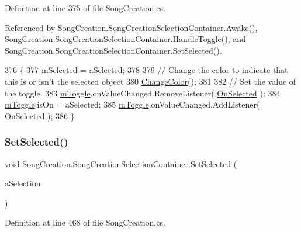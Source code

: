 Definition at line 375 of file Song\+Creation.\+cs.



Referenced by Song\+Creation.\+Song\+Creation\+Selection\+Container.\+Awake(), Song\+Creation.\+Song\+Creation\+Selection\+Container.\+Handle\+Toggle(), and Song\+Creation.\+Song\+Creation\+Selection\+Container.\+Set\+Selected().


\begin{DoxyCode}
376             \{
377                 \hyperlink{group___s_c_handlers_ga49ffd4516ec7982b1683a44b4f22de74}{mSelected} = aSelected;
378 
379                 \textcolor{comment}{// Change the color to indicate that this is or isn't the selected object}
380                 \hyperlink{group___s_c_handlers_ga3e790d06e364f26ed6f8a78cb87bbf6d}{ChangeColor}();
381 
382                 \textcolor{comment}{// Set the value of the toggle.}
383                 \hyperlink{group___s_c_handlers_gaffc6248c907c4357b0a0a30b86635f3a}{mToggle}.onValueChanged.RemoveListener( \hyperlink{group___s_c_handlers_ga33e6eb8e123cb32f40c2c06149a31087}{OnSelected} );
384                 \hyperlink{group___s_c_handlers_gaffc6248c907c4357b0a0a30b86635f3a}{mToggle}.isOn = aSelected;
385                 \hyperlink{group___s_c_handlers_gaffc6248c907c4357b0a0a30b86635f3a}{mToggle}.onValueChanged.AddListener( \hyperlink{group___s_c_handlers_ga33e6eb8e123cb32f40c2c06149a31087}{OnSelected} );
386             \}
\end{DoxyCode}
\mbox{\label{group___s_c_handlers_ga71307336af2197a0ee20bbaf3bfb02aa}} 
\subsubsection{\texorpdfstring{Set\+Selected()}{SetSelected()}\hspace{0.1cm}{\footnotesize\ttfamily [2/2]}}
{\footnotesize\ttfamily void Song\+Creation.\+Song\+Creation\+Selection\+Container.\+Set\+Selected (\begin{DoxyParamCaption}\item[{\hyperlink{group___music_enums_gaf11b5f079adbb21c800b9eca1c5c3cbd}{Music.\+N\+O\+T\+E\+\_\+\+L\+E\+N\+G\+TH}}]{a\+Selection }\end{DoxyParamCaption})}



Definition at line 468 of file Song\+Creation.\+cs.



